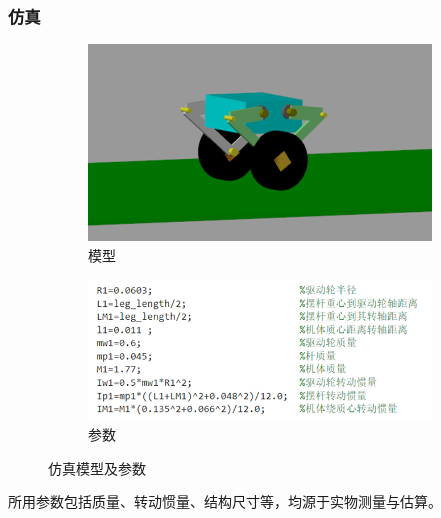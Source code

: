 \documentclass{beamer}
\begin{document}
	\begin{frame}
		\frametitle{仿真}
			\begin{figure}[t]
			\centering
			\captionsetup{font=scriptsize} 
			\begin{subfigure}{0.45\textwidth}
				\centering
				\includegraphics[width=\linewidth]{img/chapter3/model}
				\caption{模型}
			\end{subfigure}
			\hfill
			\begin{subfigure}{0.5\textwidth}
				\centering
				\includegraphics[width=\linewidth]{img/chapter3/param}
				\caption{参数}
			\end{subfigure}
			
			\vspace{-5pt}
			\captionsetup{font=scriptsize} 
			\caption{仿真模型及参数}
		\end{figure}
		所用参数包括质量、转动惯量、结构尺寸等，均源于实物测量与估算。
	\end{frame}
	
\end{document}
